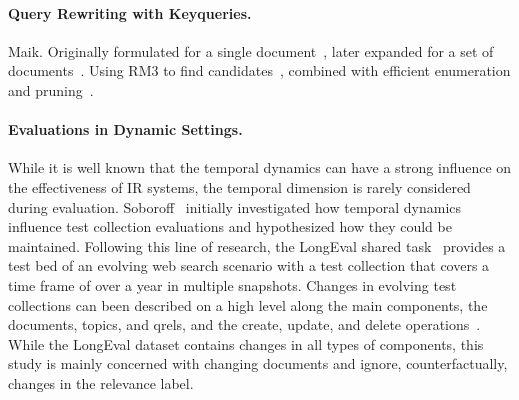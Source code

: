 \paragraph{Query Rewriting with Keyqueries.} {\color{red} Maik.} Originally formulated for a single document~\cite{gollub:2013a}, later expanded for a set of documents~\cite{hagen:2016b}. Using RM3 to find candidates~\cite{froebe:2022d}, combined with efficient enumeration and pruning~\cite{froebe:2021c}.


\paragraph{Evaluations in Dynamic Settings.} While it is well known that the temporal dynamics can have a strong influence on the effectiveness of IR systems, the temporal dimension is rarely considered during evaluation. Soboroff~\cite{DBLP:conf/sigir/Soboroff06} initially investigated how temporal dynamics influence test collection evaluations and hypothesized how they could be maintained. Following this line of research, the LongEval shared task~\cite{DBLP:conf/clef/AlkhalifaBDEAFG24,alkhalifa:2023} provides a test bed of an evolving web search scenario with a test collection that covers a time frame of over a year in multiple snapshots. Changes in evolving test collections can been described on a high level along the main components, the documents, topics, and qrels, and the create, update, and delete operations~\cite{keller:2024}. While the LongEval dataset contains changes in all types of components, this study is mainly concerned with changing documents and ignore, counterfactually, changes in the relevance label.
